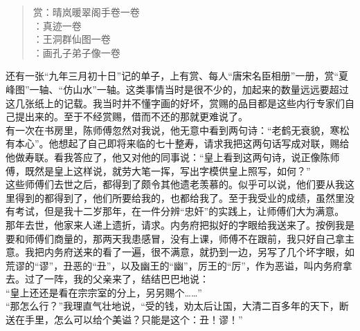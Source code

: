 \begin{quote}
	赏：晴岚暖翠阁手卷一卷\\

：真迹一卷\\

：王洞群仙图一卷\\

：画孔子弟子像一卷\\
\end{quote}

还有一张“九年三月初十日”记的单子，上有赏、每人“唐宋名臣相册”一册，赏“夏峰图”一轴、“仿山水”一轴。这类事情当时是很不少的，加起来的数量远远要超过这几张纸上的记载。我当时并不懂字画的好坏，赏赐的品目都是这些内行专家们自己提出来的。至于不经赏赐，借而不还的那就更难说了。\\

有一次在书房里，陈师傅忽然对我说，他无意中看到两句诗：“老鹤无衰貌，寒松有本心”。他想起了自己即将来临的七十整寿，请求我把这两句话写成对联，赐给他做寿联。看我答应了，他又对他的同事说：“皇上看到这两句诗，说正像陈师傅，既然是皇上这样说，就劳大笔一挥，写出字模供皇上照写，如何？”\\

这些师傅们去世之后，都得到了颇令其他遗老羡慕的。似乎可以说，他们要从我这里得到的都得到了，他们所要给我的，也都给我了。至于我受业的成绩，虽然里没有考试，但是我十二岁那年，在一件分辨“忠奸”的实践上，让师傅们大为满意。\\

那年去世，他家来人递上遗折，请求。内务府把拟好的字眼给我送来了。按例我是要和师傅们商量的，那两天我患感冒，没有上课，师傅不在跟前，我只好自己拿主意。我把内务府送来的看了一遍，很不满意，就扔到一边，另写了几个坏字眼，如荒谬的“谬”，丑恶的“丑”，以及幽王的“幽”，厉王的“厉”，作为恶谥，叫内务府拿去。过了一阵，我的父亲来了，结结巴巴地说：\\

“皇上还还是看在宗宗室的分上，另另赐个……”\\

“那怎么行？”我理直气壮地说，“受的钱，劝太后让国，大清二百多年的天下，断送在手里，怎么可以给个美谥？只能是这个：丑！谬！”\\

